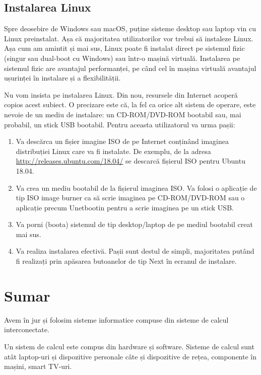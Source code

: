 \subsection{Instalarea Linux}
\label{sec:intro:linux-install}

Spre deosebire de Windows sau macOS, puține sisteme desktop sau laptop vin cu Linux preinstalat. Așa că majoritatea utilizatorilor vor trebui să instaleze Linux. Așa cum am amintit și mai sus, Linux poate fi instalat direct pe sistemul fizic (singur sau dual-boot cu Windows) sau într-o mașină virtuală. Instalarea pe sistemul fizic are avantajul performanței, pe când cel în mașina virtuală avantajul ușurinței în instalare și a flexibilității.

Nu vom insista pe instalarea Linux. Din nou, resursele din Internet acoperă copios acest subiect. O precizare este că, la fel ca orice alt sistem de operare, este nevoie de un mediu de instalare: un CD-ROM/DVD-ROM bootabil sau, mai probabil, un stick USB bootabil. Pentru aceasta utilizatorul va urma pașii:

\begin{enumerate}
  \item Va descărca un fișier imagine ISO de pe Internet conținând imaginea distribuției Linux care va fi instalate. De exemplu, de la adresa \url{http://releases.ubuntu.com/18.04/} se descarcă fișierul ISO pentru Ubuntu 18.04.
  \item Va crea un mediu bootabil de la fișierul imaginea ISO. Va folosi o aplicație de tip ISO image burner ca să scrie imaginea pe CD-ROM/DVD-ROM sau o aplicație precum Unetbootin pentru a scrie imaginea pe un stick USB.
  \item Va porni (boota) sistemul de tip desktop/laptop de pe mediul bootabil creat mai sus.
  \item Va realiza instalarea efectivă. Pașii sunt destul de simpli, majoritatea putând fi realizați prin apăsarea butoanelor de tip Next în ecranul de instalare.
\end{enumerate}

\section{Sumar}
\label{sec:intro:summary}

Avem în jur și folosim sisteme informatice compuse din sisteme de calcul interconectate.

Un sistem de calcul este compus din hardware și software. Sisteme de calcul sunt atât laptop-uri și dispozitive personale câte și dispozitive de rețea, componente în mașini, smart TV-uri.

